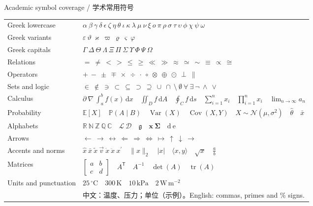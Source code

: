 \documentclass[border=3mm]{standalone}
\begin{document}
\begin{minipage}{174mm}
\fontsize{10}{14}\selectfont
\centering Academic symbol coverage / 学术常用符号\\[3mm]
\begin{tabular}{@{}p{31mm}p{137mm}@{}}
Greek lowercase & $\alpha\ \beta\ \gamma\ \delta\ \epsilon\ \zeta\ \eta\ \theta\ \iota\ \kappa\ \lambda\ \mu\ \nu\ \xi\ o\ \pi\ \rho\ \sigma\ \tau\ \upsilon\ \phi\ \chi\ \psi\ \omega$\\[2mm]
Greek variants & $\varepsilon\ \vartheta\ \varkappa\ \varpi\ \varrho\ \varsigma\ \varphi$\\[2mm]
Greek capitals & $\Gamma\ \Delta\ \Theta\ \Lambda\ \Xi\ \Pi\ \Sigma\ \Upsilon\ \Phi\ \Psi\ \Omega$\\[2mm]
Relations & $=\ \neq\ <\ >\ \leq\ \geq\ \ll\ \gg\ \approx\ \simeq\ \sim\ \equiv\ \propto\ \cong$\\[2mm]
Operators & $+\ -\ \pm\ \mp\ \times\ \div\ \cdot\ \circ\ \otimes\ \oplus\ \odot\ \perp\ \parallel$\\[2mm]
Sets and logic & $\in\ \notin\ \ni\ \subset\ \subseteq\ \supset\ \supseteq\ \cup\ \cap\ \setminus\ \emptyset\ \forall\ \exists\ \neg\ \land\ \lor$\\[2mm]
Calculus & $\partial\ \nabla\ \int_a^b f(x)\,\mathrm{d}x\quad\iint_D f\,\mathrm{d}A\quad\oint_C f\,\mathrm{d}s\quad\sum_{i=1}^{n}x_i\quad\prod_{i=1}^{n}x_i\quad\lim_{n\to\infty}a_n$\\[2mm]
Probability & $\mathbb{E}[X]\quad\mathbb{P}(A\mid B)\quad\operatorname{Var}(X)\quad\operatorname{Cov}(X,Y)\quad X\sim\mathcal{N}(\mu,\sigma^2)\quad\hat{\theta}\quad\bar{x}$\\[2mm]
Alphabets & $\mathbb{R}\ \mathbb{N}\ \mathbb{Z}\ \mathbb{Q}\ \mathbb{C}\quad\mathcal{L}\ \mathcal{D}\quad\mathfrak{g}\quad\symbf{x}\ \symbf{\Sigma}\quad\mathrm{d}\ \mathrm{e}$\\[2mm]
Arrows & $\leftarrow\ \rightarrow\ \leftrightarrow\ \Leftarrow\ \Rightarrow\ \Leftrightarrow\ \mapsto\ \uparrow\ \downarrow\ \longrightarrow$\\[2mm]
Accents and norms & $\hat{x}\ \bar{x}\ \tilde{x}\ \vec{v}\ \dot{x}\ \ddot{x}\ x^{\prime}\quad\lVert x\rVert_2\quad\lvert x\rvert\quad\langle x,y\rangle\quad\sqrt{x}\quad\frac{a}{b}$\\[2mm]
Matrices & $\begin{bmatrix}a&b\\c&d\end{bmatrix}\quad A^{\mathsf{T}}\quad A^{-1}\quad\det(A)\quad\operatorname{tr}(A)$\\[2mm]
Units and punctuation & $25\,{}^{\circ}\mathrm{C}\quad 300\,\mathrm{K}\quad 10\,\mathrm{kPa}\quad 2\,\mathrm{W\,m^{-2}}$\\
 & 中文：温度、压力；单位（示例）。English: commas, primes and \% signs.\\
\end{tabular}
\end{minipage}
\end{document}
